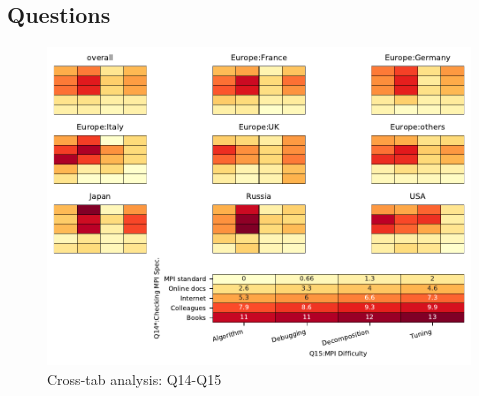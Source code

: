 
\subsection{Questions}


\begin{figure}
\begin{center}
\includegraphics[width=12cm]{../pdfs/Q14-Q15.pdf}
\caption{Cross-tab analysis: Q14-Q15}
\label{fig:Q14-Q15}
\end{center}
\end{figure}
